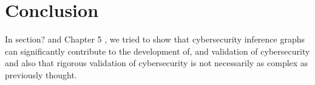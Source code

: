 \chapter{Conclusion}
In  section? and Chapter 5 , we tried to show that cybersecurity inference graphs can significantly contribute to the development of, and validation of cybersecurity and also that rigorous validation of cybersecurity is not necessarily as complex as previously thought.
